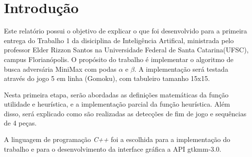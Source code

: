 \documentclass[
	article,			%
	11pt,				%
	oneside,			%
	a4paper,			%
	english,			%
	brazil,				%
	sumario=tradicional
	]{abntex2}
\begin{document}

\frenchspacing 


%
%
\maketitle


\textual

\section*{Introdução}

Este relatório possui o objetivo de explicar o que foi desenvolvido para a primeira entrega do Trabalho 1 da disiciplina de Inteligência Artifical, ministrada pelo professor Elder Rizzon Santos na Universidade Federal de Santa Catarina(UFSC), campus Florianópolis.
O propósito do trabalho é implementar o algoritmo de busca adversária MiniMax com podas $\alpha$ e $\beta$. A implementação será testada através do jogo 5 em linha (Gomoku), com tabuleiro tamanho 15x15. 

Nesta primeira etapa, serão abordadas as definições matemáticas da função utilidade e heurística, e a implementação parcial da função heurística. Além disso, será explicado como são realizadas as detecções de fim de jogo e sequências de 4 peças. 

A linguagem de programação \textit{C++} foi a escolhida para a implementação do trabalho e para o desenvolvimento da interface gráfica a API gtkmm-3.0. 

\end{document}
